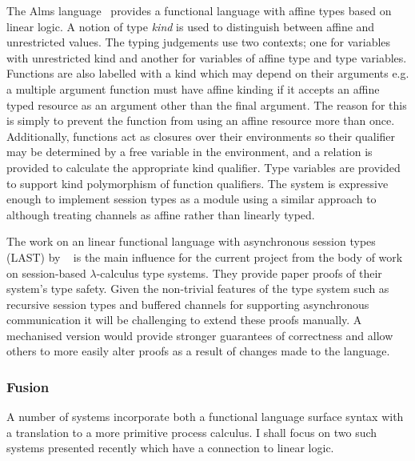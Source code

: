 The Alms language~\cite{Aldrich:2009} provides a functional language with
affine types based on linear logic. A notion of type \textit{kind} is used to
distinguish between affine and unrestricted values. The typing judgements use
two contexts; one for variables with unrestricted kind and another for
variables of affine type and type variables. Functions are also labelled with
a kind which may depend on their arguments e.g. a multiple argument function
must have affine kinding if it accepts an affine typed resource as an argument
other than the final argument. The reason for this is simply to prevent the
function from using an affine resource more than once. Additionally, functions
act as closures over their environments so their qualifier may be determined
by a free variable in the environment, and a relation is provided to calculate
the appropriate kind qualifier. Type variables are provided to support kind
polymorphism of function qualifiers. The system is expressive enough to
implement session types as a module using a similar approach to
\citeauthor{Gay:2010:LAST}~\cite{Gay:2010:LAST} although treating channels as
affine rather than linearly typed.


The work on an linear functional language with asynchronous session types
(LAST) by \citeauthor{Gay:2010:LAST}~\cite{Gay:2010:LAST} is the main
influence for the current project from the body of work on session-based
$\lambda$-calculus type systems. They provide paper proofs of their system's
type safety. Given the non-trivial features of the type system such as
recursive session types and buffered channels for supporting asynchronous
communication it will be challenging to extend these proofs manually. A
mechanised version would provide stronger guarantees of correctness and allow
others to more easily alter proofs as a result of changes made to the
language.

\subsubsection{Fusion}

A number of systems incorporate both a functional language surface syntax with
a translation to a more primitive process calculus. I shall focus on two such
systems presented recently which have a connection to linear logic.

